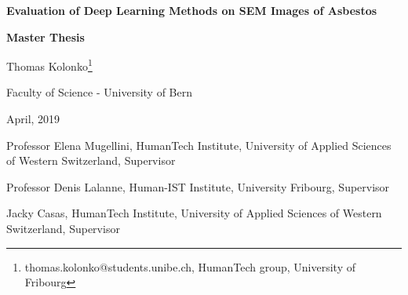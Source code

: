 \documentclass[11pt,a4paper,twoside,hidelinks,openright]{rvsmaster}
\makeatletter
\newcommand{\thesistitle}{Evaluation of Deep Learning Methods on SEM Images of Asbestos}
\newcommand{\thesisauthor}{Thomas Kolonko\footnote{thomas.kolonko@students.unibe.ch, HumanTech group, University of Fribourg}}
\newcommand{\thesisleiter}{Professor Elena Mugellini, HumanTech Institute, University of Applied Sciences of Western Switzerland, Supervisor}
\newcommand{\thesisexpert}{Professor Denis Lalanne, Human-IST Institute, University Fribourg, Supervisor}
\newcommand{\thesisasst}{Jacky Casas, HumanTech Institute, University of Applied Sciences of Western Switzerland, Supervisor}
\newcommand{\thesisdate}{April, 2019}
\makeatother
\begin{document}
\begin{titlepage}  
  \begin{center}  
  
  \begin{figure}[t]  
  \vspace*{-2cm}        %
  \vspace{0.4in}     
  \end{figure}

    \thispagestyle{empty}
    
    {\bfseries\Huge \thesistitle \par}

    \vspace{0.3in} 
    \LARGE{\textbf{Master Thesis} \\}
    \vspace{0.4in}

    {\Large \thesisauthor}
    
    \vspace{0.3in}
    {\Large Faculty of Science - University of Bern \par}
    \vfill
    {\Large \thesisdate \par}
    \vspace{0.3in}
    {\normalsize \thesisleiter \par}
	\vspace{0.15in}    
    {\normalsize \thesisexpert \par}
    \vspace{0.15in}    
    {\normalsize \thesisasst \par}
  

  \vspace{0.9in}
 

\end{center}
\end{titlepage}
\end{document}

